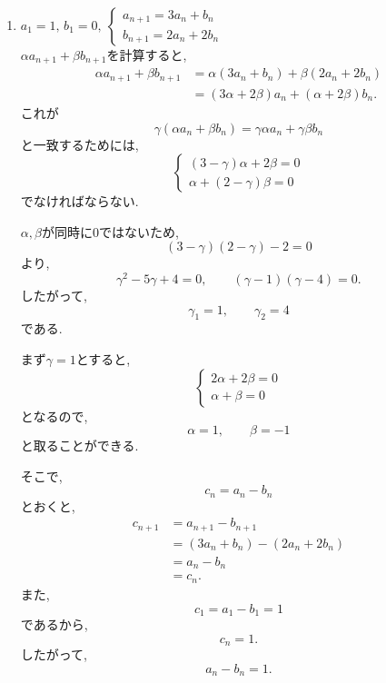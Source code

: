 \documentclass[dvipdfmx,a4paper,11pt,fleqn,openany]{jsbook}
\begin{document}
\begin{enumerate}[label=(\arabic*),parsep=3pt]
\begin{enumerate}
                    また,\((1)-(2)\)をすると,
                    \[
                      2b_n=2\cdot4^{n-1}
                    \]
                    なので,
                    \[
                      b_n=4^{n-1}.
                    \]
            \end{enumerate}
      \item $\displaystyle a_1=1,\,b_1=0,\ \begin{cases}a_{n+1}=3a_n+b_n\\ b_{n+1}=2a_n+2b_n\end{cases}$\\
            $\alpha a_{n+1}+\beta b_{n+1}$を計算すると,
            \begin{align*}
              \alpha a_{n+1}+\beta b_{n+1}
                &=\alpha(3a_n+b_n)+\beta(2a_n+2b_n)\\
                &=(3\alpha+2\beta)a_n+(\alpha+2\beta)b_n.
            \end{align*}
            これが
            \[
              \gamma(\alpha a_n+\beta b_n)
              =\gamma\alpha a_n+\gamma\beta b_n
            \]
            と一致するためには,
            \[
            \begin{cases}
              (3-\gamma)\alpha+2\beta=0\\
              \alpha+(2-\gamma)\beta=0
            \end{cases}
            \]
            でなければならない.

            $\alpha,\beta$が同時に$0$ではないため,
            \[
              (3-\gamma)(2-\gamma)-2=0
            \]
            より,
            \[
              \gamma^2-5\gamma+4=0,
              \qquad
              (\gamma-1)(\gamma-4)=0.
            \]
            したがって,
            \[
              \gamma_1=1,\qquad\gamma_2=4
            \]
            である.

            まず$\gamma=1$とすると,
            \[
            \begin{cases}
              2\alpha+2\beta=0\\
              \alpha+\beta=0
            \end{cases}
            \]
            となるので,
            \[
              \alpha=1,\qquad\beta=-1
            \]
            と取ることができる.

            そこで,
            \[
              c_n=a_n-b_n
            \]
            とおくと,
            \begin{align*}
              c_{n+1}
                &=a_{n+1}-b_{n+1}\\
                &=(3a_n+b_n)-(2a_n+2b_n)\\
                &=a_n-b_n\\
                &=c_n.
            \end{align*}
            また,
            \[
              c_1=a_1-b_1=1
            \]
            であるから,
            \[
              c_n=1.
            \]
            したがって,
            \[
              a_n-b_n=1.
            \]


\end{enumerate}
\end{document}
